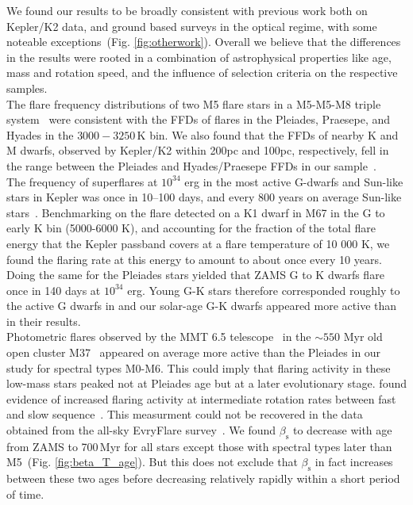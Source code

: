 \documentclass{aa}
\begin{document}
We found our results to be broadly consistent with previous work both on Kepler/K2 data, and ground based surveys in the optical regime, with some noteable exceptions~(Fig. \ref{fig:otherwork}). Overall we believe that the differences in the results were rooted in a combination of astrophysical properties like age, mass and rotation speed, and the influence of selection criteria on the respective samples. 
\\
The flare frequency distributions of two M5 flare stars in a M5-M5-M8 triple system~\citep{lurie2015} were consistent with the FFDs of flares in the Pleiades, Praesepe, and Hyades in the $3000-3250\,$K bin. We also found that the FFDs of nearby K and M dwarfs, observed by Kepler/K2 within 200pc and 100pc, respectively, fell in the range between the Pleiades and Hyades/Praesepe FFDs in our sample~\citep{lin2019}.
\\
The frequency of superflares at $10^{34}$ erg in the most active G-dwarfs and Sun-like stars in Kepler was once in 10–100 days, and every 800 years on average Sun-like stars~\citep{shibayama2013}. Benchmarking on the flare detected on a K1 dwarf in M67 in the G to early K bin (5000-6000 K), and accounting for the fraction of the total flare energy that the Kepler passband covers at a flare temperature of 10 000 K, we found the flaring rate at this energy to amount to about once every 10 years. Doing the same for the Pleiades stars yielded that ZAMS G to K dwarfs flare once in 140 days at $10^{34}$ erg. Young G-K stars therefore corresponded roughly to the active G dwarfs in \citet{shibayama2013} and our solar-age G-K dwarfs appeared more active than in their results.
\\
Photometric flares observed by the MMT 6.5 telescope~\citep{hartman2008} in the $\sim550$ Myr old open cluster M37~\citep{chang2015} appeared on average more active than the Pleiades in our study for spectral types M0-M6. This could imply that flaring activity in these low-mass stars peaked not at Pleiades age but at a later evolutionary stage. \citet{mondrik2019} found evidence of increased flaring activity at intermediate rotation rates between fast and slow sequence~\citep{barnes_rotational_2003}. This measurment could not be recovered in the data obtained from the all-sky EvryFlare survey~\citep{howard_evryflare2arxiv_2019}. We found $\beta_\mathrm{s}$ to decrease with age from ZAMS to 700\,Myr for all stars except those with spectral types later than M5~(Fig. \ref{fig:beta_T_age}). But this does not exclude that $\beta_\mathrm{s}$ in fact increases between these two ages before decreasing relatively rapidly within a short period of time.
\end{document}
